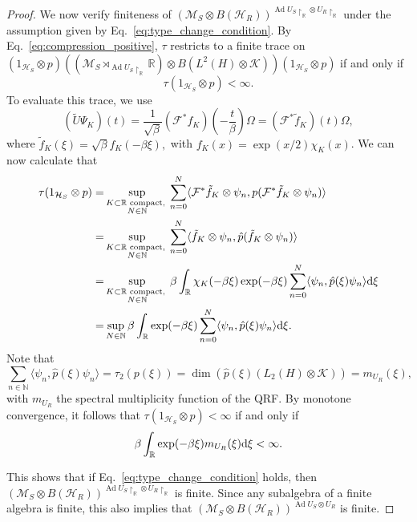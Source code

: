 \documentclass[sn-mathphys-num]{sn-jnl}%
\newcommand{\RR}{\mathbb{R}}
\newcommand{\HH}{\mathcal{H}}
\newcommand{\KK}{\mathcal{K}}
\newcommand{\MM}{\mathcal{M}}
\DeclareMathOperator{\Ad}{Ad}
\newcommand{\diff}{\textup{d}}
\numberwithin{equation}{section}
\theoremstyle{thmstyleone}%
\theoremstyle{thmstyletwo}%
\theoremstyle{thmstylethree}%
\begin{document}
\begin{proof}
    We now verify finiteness of $(\MM_S\otimes B(\HH_R))^{\Ad U_S\restriction_\RR\otimes U_R\restriction_\RR}$ under the assumption given by Eq.\ \eqref{eq:type_change_condition}. By Eq.~\eqref{eq:compression_positive}, $\tau$ restricts to a finite trace on $(1_{\HH_S}\otimes p)((\MM_S\rtimes_{\Ad U_S\restriction_\RR}\RR)\otimes B(L^2(H)\otimes\KK))(1_{\HH_S}\otimes p)$ if and only if 
    \begin{equation}
        \tau(1_{\HH_S}\otimes p)<\infty.
    \end{equation}
    To evaluate this trace, we use 
    \begin{equation}
        (\tilde{U}\Psi_K)(t)=\frac{1}{\sqrt{\beta}}(\mathcal{F}^*f_K)\left(-\frac{t}{\beta}\right)\Omega=(\mathcal{F}^*\tilde{f}_K)(t)\Omega,
    \end{equation}
    where $\tilde{f}_K(\xi)=\sqrt{\beta}f_K(-\beta\xi),$ with $f_K(x)=\exp(x/2)\chi_K(x)$. We can now calculate that
    \begin{align}
        \tau(1_{\HH_S}\otimes p)=&\sup_{\substack{K\subset\RR\text{ compact, }\\N\in\mathbb{N}}}\sum_{n=0}^N\langle \mathcal{F}^*\tilde{f}_K\otimes\psi_n,p(\mathcal{F}^*\tilde{f}_K\otimes\psi_n)\rangle\nonumber\\
        =&\sup_{\substack{K\subset\RR\text{ compact, }\\N\in\mathbb{N}}}\sum_{n=0}^N\langle \tilde{f}_K\otimes\psi_n,\hat{p}(\tilde{f}_K\otimes\psi_n)\rangle\nonumber\\
        =&\sup_{\substack{K\subset\RR\text{ compact, }\\N\in\mathbb{N}}}\beta\int_\RR\chi_K(-\beta\xi)\exp(-\beta\xi)\sum_{n=0}^N \langle\psi_n,\hat{p}(\xi)\psi_n\rangle\diff\xi\nonumber\\
        =&\sup_{N\in\mathbb{N}}\beta\int_\RR\exp(-\beta\xi)\sum_{n=0}^N \langle\psi_n,\hat{p}(\xi)\psi_n\rangle\diff\xi.
    \end{align}
    Note that 
    \begin{equation}\label{eq:multiplicity function in a basis}
        \sum_{n\in \mathbb{N}}\langle\psi_n,\hat{p}(\xi)\psi_n\rangle=\tau_2(p(\xi))=\dim(\hat{p}(\xi)(L_2(H)\otimes\KK))=m_{U_R}(\xi),
    \end{equation} 
    with $m_{U_R}$ the spectral multiplicity function of the QRF.
    By monotone convergence, it follows that $\tau(1_{\HH_S}\otimes p)<\infty$ if and only if 
    \begin{equation}
        \beta\int_\RR\exp(-\beta\xi)m_{U_R}(\xi)\diff\xi<\infty.
    \end{equation}

    This shows that if Eq.\ \eqref{eq:type_change_condition} holds, then $(\MM_S\otimes B(\HH_R))^{\Ad U_S\restriction_\RR\otimes U_R\restriction_\RR}$ is finite. Since any subalgebra of a finite algebra is finite, this also implies that $(\MM_S\otimes B(\HH_R))^{\Ad U_S\otimes U_R}$ is finite.
\end{proof}
\end{document}
